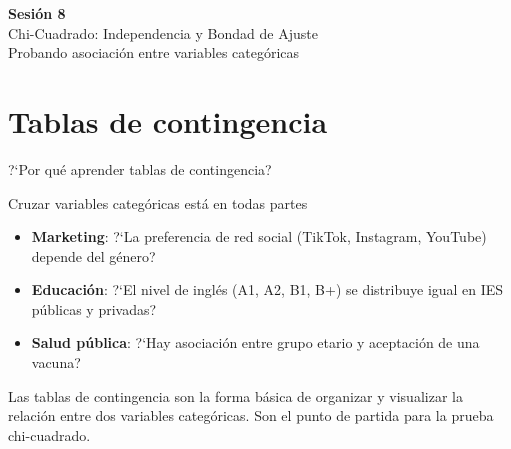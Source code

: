 \documentclass[aspectratio=169, 11pt]{beamer}
\begin{document}
\begin{frame}{}
\vfill
\centering
{\Large\textbf{Sesi\'on 8}}\\[1em]
{\normalsize Chi-Cuadrado: Independencia y Bondad de Ajuste}\\[0.5em]
{\small Probando asociaci\'on entre variables categ\'oricas}
\vfill
\end{frame}

\section{Tablas de contingencia}

\begin{frame}{?`Por qu\'e aprender tablas de contingencia?}
\small
\begin{exampleblock}{Cruzar variables categ\'oricas est\'a en todas partes}
\begin{itemize}\setlength{\itemsep}{2pt}
  \item \textbf{Marketing}: ?`La preferencia de red social (TikTok, Instagram, YouTube) depende del g\'enero?
  \item \textbf{Educaci\'on}: ?`El nivel de ingl\'es (A1, A2, B1, B+) se distribuye igual en IES p\'ublicas y privadas?
  \item \textbf{Salud p\'ublica}: ?`Hay asociaci\'on entre grupo etario y aceptaci\'on de una vacuna?
\end{itemize}
\end{exampleblock}

\vspace{0.2cm}
Las tablas de contingencia son la forma b\'asica de organizar y visualizar la relaci\'on entre dos variables categ\'oricas. Son el punto de partida para la prueba chi-cuadrado.
\end{frame}
\end{document}
